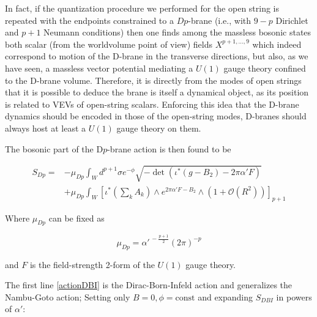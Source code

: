 In fact, if the quantization procedure we performed for the open string is repeated with the endpoints constrained to a $Dp$-brane (i.e., with $9-p$ Dirichlet and $p+1$ Neumann conditions) then one finds among the massless bosonic states both scalar (from the worldvolume point of view) fields $X^{p+1,\ldots,9}$ which indeed correspond to motion of the D-brane in the transverse directions, but also, as we have seen, a massless vector potential mediating a $U(1)$ gauge theory confined to the D-brane volume. Therefore, it is directly from the modes of open strings that it is possible to deduce the brane is itself a dynamical object, as its position is related to VEVs of open-string scalars. Enforcing this idea that the D-brane dynamics should be encoded in those of the open-string modes, D-branes should always host at least a $U(1)$ gauge theory on them.


The bosonic part of the D$p$-brane action is then found to be


\begin{align}
	S_{Dp} = & -\mu_{Dp} \int_W d^{p+1}\sigma e^{-\phi} \sqrt{ - \det \left( \iota^{*}(g - B_2) - 2\pi\alpha' F \right)} \label{actionDBI}\\
& + \mu_{Dp} \int_W \left[ \iota^{*}\left(\sum_k A_k \right) \wedge e^{2\pi\alpha'F-B_2} \wedge (1 + \mathcal{O}(R^2))
\right]_{p+1} 	\label{actionCS}
\end{align}

Where $\mu_{Dp}$ can be fixed as 

\begin{equation}
	\mu_{Dp} = \alpha'^{\,-\frac{p+1}2}(2\pi)^{-p}
	\label{}
\end{equation}

and $F$ is the field-strength 2-form of the $U(1)$ gauge theory.

The first line \eqref{actionDBI} is the Dirac-Born-Infeld action and generalizes the Nambu-Goto action; Setting only $B=0, \phi = \mathrm{const}$ and expanding $S_{DBI}$ in powers of $\alpha'$:

